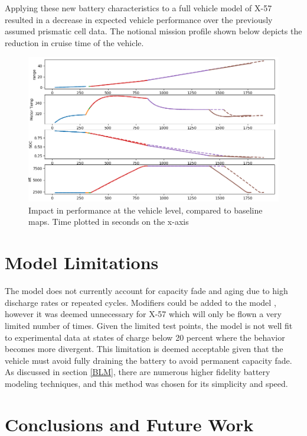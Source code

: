 \documentclass[]{aiaa-tc}%
\begin{document}
Applying these new battery characteristics to a full vehicle model of X-57 resulted in a decrease in expected vehicle performance over the previously assumed prismatic cell data. The notional mission profile shown below depicts the reduction in cruise time of the vehicle. 

\begin{figure}[!htb]
	\centering
	\includegraphics[width=1.0\textwidth]{figures/batt_mission.png}
	\caption{Impact in performance at the vehicle level, compared to baseline maps. Time plotted in seconds on the x-axis}
	\label{fig:Mission}
\end{figure}

\section{Model Limitations}
The model does not currently account for capacity fade and aging due to high discharge rates or repeated cycles. Modifiers could be added to the model \cite{Ning}, however it was deemed unnecessary for X-57 which will only be flown a very limited number of times. Given the limited test points, the model is not well fit to experimental data at states of charge below 20 percent where the behavior becomes more divergent. This limitation is deemed acceptable given that the vehicle must avoid fully draining the battery to avoid permanent capacity fade. As discussed in section \ref{BLM}, there are numerous higher fidelity battery modeling techniques, and this method was chosen for its simplicity and speed.


\section{Conclusions and Future Work}
\end{document}
